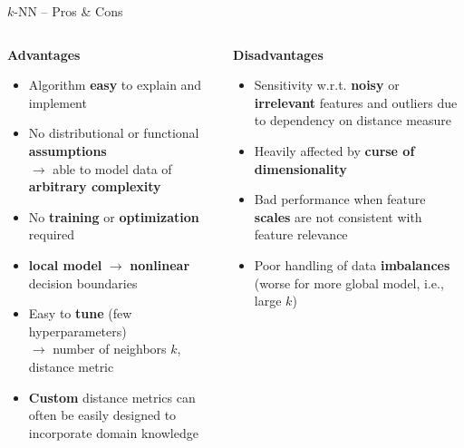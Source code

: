 \documentclass[11pt,compress,t,notes=noshow, xcolor=table]{beamer}
\newcommand{\highlight}[1]{\textcolor{hlcol}{\textbf{#1}}}
\newcommand{\positem}{\item[\textcolor{hlcol}{$\bm{+}$}]}
\newcommand{\negitem}{\item[\textcolor{hlcol}{$\bm{-}$}]}
\begin{document}
\begin{frame2}{$k$-NN -- Pros \& Cons}
  \footnotesize

\begin{columns}[onlytextwidth]
  \begin{column}{0.5\textwidth}
    \highlight{Advantages}
    \footnotesize
    \begin{itemize}
      \positem Algorithm \textbf{easy} to explain and implement
      \positem No distributional or functional \textbf{assumptions}\\
      $\rightarrow$ able to model data of \textbf{arbitrary complexity} %
      \positem No \textbf{training} or \textbf{optimization} required 
      \positem \textbf{local model} $\rightarrow$ \textbf{nonlinear} decision boundaries
      \positem Easy to \textbf{tune} (few hyperparameters)\\
      $\rightarrow$ number of neighbors $k$, distance metric
      \positem \textbf{Custom} distance metrics can often be easily designed to incorporate domain knowledge
    \end{itemize}
  \end{column}
  \begin{column}{0.5\textwidth}
    \highlight{Disadvantages}
    \footnotesize
    \begin{itemize}
      \negitem Sensitivity w.r.t. \textbf{noisy} or \textbf{irrelevant} features and outliers due to dependency on distance measure
      \negitem Heavily affected by \textbf{curse of dimensionality}
      \negitem Bad performance when feature \textbf{scales} are not consistent with feature relevance
      \negitem Poor handling of data \textbf{imbalances} (worse for more global model, i.e., large $k$)
    \end{itemize}
  \end{column}
\end{columns}
  
\end{frame2}
\end{document}
